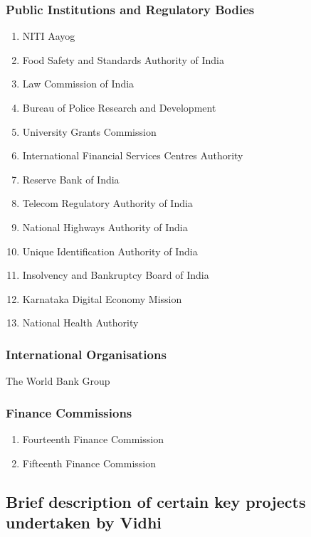 \documentclass[a4paper,11pt]{article}
\begin{document}
        \subsubsection{Public Institutions and Regulatory Bodies}
        
        \begin{enumerate}
            \item NITI Aayog
            \item Food Safety and Standards Authority of India
            \item Law Commission of India
            \item Bureau of Police Research and Development
            \item University Grants Commission
            \item International Financial Services Centres Authority
            \item Reserve Bank of India
            \item Telecom Regulatory Authority of India
            \item National Highways Authority of India
            \item Unique Identification Authority of India
            \item Insolvency and Bankruptcy Board of India
            \item Karnataka Digital Economy Mission
            \item National Health Authority
        \end{enumerate}
        
        \subsubsection{International Organisations}
        
        The World Bank Group
        
        \subsubsection{Finance Commissions}
        
        \begin{enumerate}
            \item Fourteenth Finance Commission
            \item Fifteenth Finance Commission
        \end{enumerate}
    
    \subsection{Brief description of certain key projects undertaken by Vidhi}
    
\end{document}
